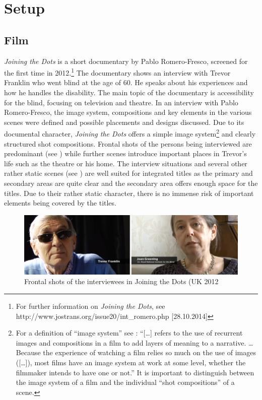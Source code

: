 \documentclass[output=paper]{langsci/langscibook}
\begin{document}
\section{Setup}

\subsection{Film}

\textit{Joining the Dots} is a short documentary by Pablo Romero-Fresco, screened for the first time in 2012.\footnote{For further information on \textit{Joining the Dots}, see http://www.jostrans.org/issue20/int\_romero.php [28.10.2014]} The documentary shows an interview with Trevor Franklin who went blind at the age of 60. He speaks about his experiences and how he handles the disability. The main topic of the documentary is accessibility for the blind, focusing on television and theatre. In an interview with Pablo Romero-Fresco, the image system, compositions and key elements in the various scenes were defined and possible placements and designs discussed. Due to its documental character, \textit{Joining the Dots} offers a simple image system\footnote{For a definition of ``image system'' see \citet[21]{mercado2010}: ``[\ldots] refers to the use of recurrent images and compositions in a film to add layers of meaning to a narrative. \ldots Because the experience of watching a film relies so much on the use of images ([\ldots]), most films have an image system at work at some level, whether the filmmaker intends to have one or not.'' It is important to distinguish between the image system of a film and the individual ``shot compositions'' of a scene.} and clearly structured shot compositions. Frontal shots of the persons being interviewed are predominant (see ) while further scenes introduce important places in Trevor's life such as the theatre or his home. The interview situations and several other rather static scenes (see ) are well suited for integrated titles as the primary and secondary areas are quite clear and the secondary area offers enough space for the titles. Due to their rather static character, there is no immense risk of important elements being covered by the titles.


\begin{figure}
 \includegraphics[width=\textwidth]{figures/Fox1.png}
 \caption{Frontal shots of the interviewees in Joining the Dots (UK 2012}
  \label{fox:fig:1}
\end{figure}  
\end{document}
